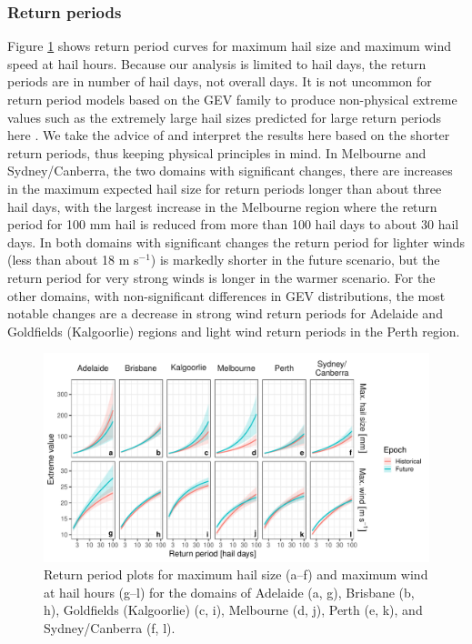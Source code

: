 \documentclass[]{agujournal2019}\usepackage[]{graphicx}\usepackage[]{xcolor}
\begin{document}
\subsubsection{Return periods}

Figure \ref{fig:return_periods_probs_hail} shows return period curves for maximum hail size and maximum wind speed at hail hours. Because our analysis is limited to hail days, the return periods are in number of hail days, not overall days. It is not uncommon for return period models based on the GEV family to produce non-physical extreme values such as the extremely large hail sizes predicted for large return periods here \cite[p. 66]{Coles_2001}. We take the advice of  and interpret the results here based on the shorter return periods, thus keeping physical principles in mind. In Melbourne and Sydney/Canberra, the two domains with significant changes, there are increases in the maximum expected hail size for return periods longer than about three hail days, with the largest increase in the Melbourne region where the return period for 100 mm hail is reduced from more than 100 hail days to about 30 hail days. In both domains with significant changes the return period for lighter winds (less than about 18 m s$^{-1}$) is markedly shorter in the future scenario, but the return period for very strong winds is longer in the warmer scenario. For the other domains, with non-significant differences in GEV distributions, the most notable changes are a decrease in strong wind return periods for Adelaide and Goldfields (Kalgoorlie) regions and light wind return periods in the Perth region.

\begin{figure}[!ht]
      \includegraphics[width=\textwidth]{figures/return_periods}
      \caption{Return period plots for maximum hail size (a--f) and maximum wind at hail hours (g--l) for the domains of Adelaide (a, g), Brisbane (b, h), Goldfields (Kalgoorlie) (c, i), Melbourne (d, j), Perth (e, k), and Sydney/Canberra (f, l).}
      \label{fig:return_periods_probs_hail}
\end{figure}
\end{document}
